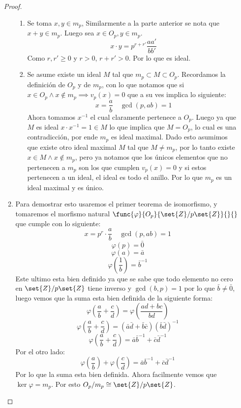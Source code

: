 \documentclass[11pt]{article}
\begin{document}
\begin{enumerate}
\begin{proof}
\begin{enumerate}[label=(\alph*)]
\begin{enumerate}
                    \item Se toma $x,y\in m_p$, Similarmente a la parte anterior se nota que $x+y\in m_p$. Luego sea $x\in O_p, y\in m_p$.
                    \[x\cdot y=p^{r+r'}\frac{aa'}{bb'}\]
                    Como $r,r'\geq 0$ y $r>0$, $r+r'>0$. Por lo que es ideal.

                    \item Se asume existe un ideal $M$ tal que $m_p\subset M\subset O_p$. Recordamos la definición de $O_p$ y de $m_p$, con lo que notamos que si $x\in O_p\wedge x\notin m_p\implies v_p(x)=0$ que a su ves implica lo siguiente:
                    \[x=\frac{a}{b}\quad \gcd(p,ab)=1\]
                    Ahora tomamos $x^{-1}$ el cual claramente pertenece a $O_p$. Luego ya que $M$ es ideal $x\cdot x^{-1}=1\in M$ lo que implica que $M=O_p$, lo cual es una contradicción, por ende $m_p$ es ideal maximal. Dado esto asumimos que existe otro ideal maximal $M$ tal que $M\neq m_p$, por lo tanto existe $x\in M\wedge x\notin m_p$, pero ya notamos que los únicos elementos que no pertenecen a $m_p$ son los que cumplen $v_p(x)=0$ y si estos pertenecen a un ideal, el ideal es todo el anillo. Por lo que $m_p$ es un ideal maximal y es único.
                \end{enumerate}

                \item Para demostrar esto usaremos el primer teorema de isomorfismo, y tomaremos el morfismo natural $\func{\varphi}{O_p}{\set{Z}/p\set{Z}}{}{}$ que cumple con lo siguiente:
                \[x=p^r\cdot\frac{a}{b}\quad\gcd(p,ab)=1\]
                \[\varphi(p)=\bar{0}\]
                \[\varphi(a)=\bar{a}\]
                \[\varphi\left(\frac{1}{b}\right)=\bar{b}^{-1}\]
                Este ultimo esta bien definido ya que se sabe que todo elemento no cero en $\set{Z}/p\set{Z}$ tiene inverso y $\gcd(b,p)=1$ por lo que $\bar{b}\neq\bar{0}$, luego vemos que la suma esta bien definida de la siguiente forma:
                \[\varphi\left(\frac{a}{b}+\frac{c}{d}\right)=\varphi\left(\frac{ad+bc}{bd}\right)\]
                \[\varphi\left(\frac{a}{b}+\frac{c}{d}\right)=(\bar{a}\bar{d}+\bar{b}\bar{c})(\bar{b}\bar{d})^{-1}\]
                \[\varphi\left(\frac{a}{b}+\frac{c}{d}\right)=\bar{a}\bar{b}^{-1}+\bar{c}\bar{d}^{-1}\]
                Por el otro lado:
                \[\varphi\left(\frac{a}{b}\right)+\varphi\left(\frac{c}{d}\right)=\bar{a}\bar{b}^{-1}+\bar{c}\bar{d}^{-1}\]
                Por lo que la suma esta bien definida. Ahora facilmente vemos que $\ker\varphi=m_p$. Por esto $O_p/m_p\cong\set{Z}/p\set{Z}$.


\end{enumerate}
\end{proof}
\end{enumerate}
\end{document}
